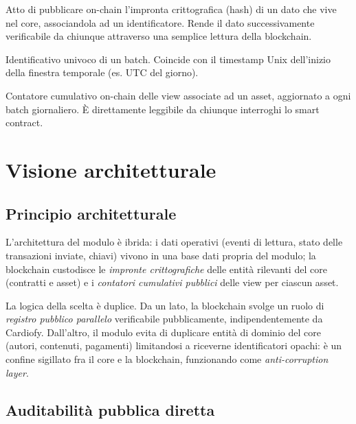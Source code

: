 \documentclass[a4paper,11pt]{article}
\begin{document}
\begin{description}[leftmargin=0pt, itemsep=0.3em, font=\sffamily\bfseries]
\item[Notarizzazione] Atto di pubblicare on-chain l'impronta crittografica (hash) di un dato che vive nel core, associandola ad un identificatore. Rende il dato successivamente verificabile da chiunque attraverso una semplice lettura della blockchain.

\item[periodId] Identificativo univoco di un batch. Coincide con il timestamp Unix dell'inizio della finestra temporale (es. UTC del giorno).

\item[totalViews] Contatore cumulativo on-chain delle view associate ad un asset, aggiornato a ogni batch giornaliero. \`E direttamente leggibile da chiunque interroghi lo smart contract.
\end{description}

\section{Visione architetturale}\label{sec:architettura}

\subsection{Principio architetturale}

L'architettura del modulo \`e ibrida: i dati operativi (eventi di lettura, stato delle transazioni inviate, chiavi) vivono in una base dati propria del modulo; la blockchain custodisce le \emph{impronte crittografiche} delle entit\`a rilevanti del core (contratti e asset) e i \emph{contatori cumulativi pubblici} delle view per ciascun asset.

La logica della scelta \`e duplice. Da un lato, la blockchain svolge un ruolo di \emph{registro pubblico parallelo} verificabile pubblicamente, indipendentemente da Cardiofy. Dall'altro, il modulo evita di duplicare entit\`a di dominio del core (autori, contenuti, pagamenti) limitandosi a riceverne identificatori opachi: \`e un confine sigillato fra il core e la blockchain, funzionando come   \emph{anti-corruption layer}.

\subsection{Auditabilit\`a pubblica diretta}
\end{document}
